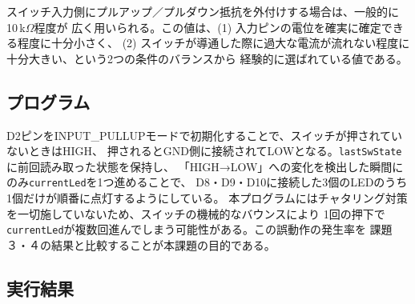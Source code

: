 \documentclass[12pt,a4paper]{ltjsarticle}
\begin{document}
スイッチ入力側にプルアップ／プルダウン抵抗を外付けする場合は、一般的に10\,k$\Omega$程度が
広く用いられる。この値は、(1) 入力ピンの電位を確実に確定できる程度に十分小さく、
(2) スイッチが導通した際に過大な電流が流れない程度に十分大きい、という2つの条件のバランスから
経験的に選ばれている値である。

\subsection{プログラム}\label{sec:task2-program}



D2ピンをINPUT\_PULLUPモードで初期化することで、スイッチが押されていないときはHIGH、
押されるとGND側に接続されてLOWとなる。\texttt{lastSwState}に前回読み取った状態を保持し、
「HIGH→LOW」への変化を検出した瞬間にのみ\texttt{currentLed}を1つ進めることで、
D8・D9・D10に接続した3個のLEDのうち1個だけが順番に点灯するようにしている。
本プログラムにはチャタリング対策を一切施していないため、スイッチの機械的なバウンスにより
1回の押下で\texttt{currentLed}が複数回進んでしまう可能性がある。この誤動作の発生率を
課題３・４の結果と比較することが本課題の目的である。

\subsection{実行結果}\label{sec:task2-result}

%

%

\end{document}
